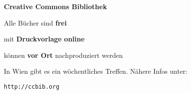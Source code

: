 \documentclass[paper=a6,landscape,pagesize,DIV=20,fontsize=12pt]{scrartcl}
\newcommand\catchword[1]{\textbf{\large#1}}
\newcommand\headline[1]{\begin{center}\Huge \textbf{#1}\end{center}}
\begin{document}
\headline{Creative Commons Bibliothek}
\medskip
\vfill

Alle Bücher sind \catchword{frei}

\begin{center}
mit \catchword{Druckvorlage online}
\end{center}

\begin{flushright}
können \catchword{vor Ort} nachproduziert werden
\end{flushright}

\vfill

\begin{center}
\small
In Wien gibt es ein wöchentliches Treffen. Nähere Infos unter:

\LARGE\texttt{http://ccbib.org}
\end{center}
\end{document}
